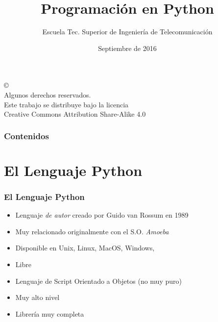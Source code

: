 \documentclass[ucs]{beamer}
\begin{document}
\title[Programación en Python]{Programación en Python}
\author[GSyC]{Escuela Tec. Superior de Ingeniería de Telecomunicación}
\date[2016]{Septiembre de 2016}


\begin{frame}
  \titlepage
\end{frame}



\begin{frame}[b]
\begin{flushright}
{\tiny
\copyright \insertshortdate~\insertshortauthor \\
  Algunos derechos reservados. \\
  Este trabajo se distribuye bajo la licencia \\
  Creative Commons Attribution Share-Alike 4.0
}
\end{flushright}  
\end{frame}



\begin{frame}
  \frametitle{Contenidos}
\begin{small}
  \tableofcontents
\end{small}
\end{frame}





\section{El Lenguaje Python}


\begin{frame}[fragile]
\frametitle{El Lenguaje Python}
  \begin{itemize}
  \item Lenguaje \emph{de autor} creado por Guido van Rossum en 1989
  \item Muy relacionado originalmente con el S.O. \emph{Amoeba}
  \item Disponible en Unix, Linux, MacOS, Windows, 
  \item Libre
  \item Lenguaje de Script Orientado a Objetos (no muy puro)
  \item Muy alto nivel
  \item Librería muy completa

 \end{itemize}
\end{frame}
\end{document}
